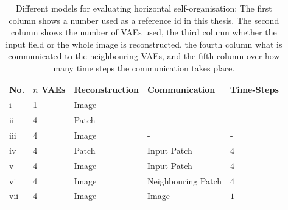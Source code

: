 \begin{table}[h] 
    \centering
	 \begin{tabular}{l l l l l}
    	\textbf{No.} & \textbf{$n$ VAEs} & \textbf{Reconstruction} & \textbf{Communication} & \textbf{Time-Steps}\\
        \hline
		i & 1 & Image & -  & -\\
		ii & 4 & Patch & -  & -\\
		iii & 4 & Image & - & -\\
		iv & 4 & Patch & Input Patch & $4$\\ %
		v & 4 & Image & Input Patch & $4$\\  %
		vi & 4 & Image & Neighbouring Patch & $4$\\ %
		vii & 4 & Image & Image & $1$\\
    \end{tabular}
    \caption[Different Models to Evaluate Horizontal Self-Organisation]{Different models for evaluating horizontal self-organisation: The first column shows a number used as a reference id in this thesis. The second column shows the number of VAEs used, the third column whether the input field or the whole image is reconstructed, the fourth column what is communicated to the neighbouring VAEs, and the fifth column over how many time steps the communication takes place.}
\end{table}

